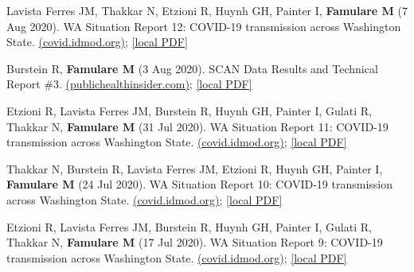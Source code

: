 \documentclass{article}
\begin{document}
\begin{llist}
\begin{items}
	\item[{[29]}] Lavista Ferres JM, Thakkar N, Etzioni R,  Huynh GH, Painter I, \textbf{Famulare M} (7 Aug 2020). WA Situation Report 12: COVID-19 transmission across Washington State. \href{https://iazpvnewgrp01.blob.core.windows.net/source/2021-02/reports/pdf/WA_Situation_Report_12_COVID-19_transmission_across_Washington_State.pdf}{(covid.idmod.org)}; \href{https://famulare.github.io/assets/publication-mirror/WA_Situation_Report_12_COVID-19_transmission_across_Washington_State.pdf}{[local PDF]}
	
	\item[{[28]}] Burstein R, \textbf{Famulare M} (3 Aug 2020). SCAN Data Results and Technical Report \#3. \href{https://publichealthinsider.com/wp-content/uploads/2020/08/8.3-SCAN-Technical-Report-3_FINAL_CLEAN.pdf}{(publichealthinsider.com)}; \href{https://famulare.github.io/assets/publication-mirror/8.3-SCAN-Technical-Report-3_FINAL_CLEAN.pdf}{[local PDF]}
	
	\item[{[27]}] Etzioni R, Lavista Ferres JM, Burstein R, Huynh GH, Painter I, Gulati R, Thakkar N, \textbf{Famulare M} (31 Jul 2020). WA Situation Report 11: COVID-19 transmission across Washington State. \href{https://iazpvnewgrp01.blob.core.windows.net/source/2021-02/reports/pdf/WA_Situation_Report_11_COVID-19_transmission_across_Washington_State.pdf}{(covid.idmod.org)}; \href{https://famulare.github.io/assets/publication-mirror/WA_Situation_Report_11_COVID-19_transmission_across_Washington_State.pdf}{[local PDF]}
	
	\item[{[26]}] Thakkar N, Burstein R,  Lavista Ferres JM, Etzioni R,  Huynh GH, Painter I,  \textbf{Famulare M} (24 Jul 2020). WA Situation Report 10: COVID-19 transmission across Washington State. \href{https://iazpvnewgrp01.blob.core.windows.net/source/2021-02/reports/pdf/WA_Situation_Report_10_COVID-19_transmission_across_Washington_State.pdf}{(covid.idmod.org)}; \href{https://famulare.github.io/assets/publication-mirror/WA_Situation_Report_10_COVID-19_transmission_across_Washington_State.pdf}{[local PDF]}
	
	\item[{[25]}] Etzioni R, Lavista Ferres JM, Burstein R, Huynh GH, Painter I, Gulati R, Thakkar N, \textbf{Famulare M} (17 Jul 2020). WA Situation Report 9: COVID-19 transmission across Washington State. \href{https://iazpvnewgrp01.blob.core.windows.net/source/2021-02/reports/pdf/WA_Situation_Report_9_COVID-19_transmission_across_Washington_State.pdf}{(covid.idmod.org)}; \href{https://famulare.github.io/assets/publication-mirror/WA_Situation_Report_9_COVID-19_transmission_across_Washington_State.pdf}{[local PDF]}
	

\end{items}
\end{llist}
\end{document}
